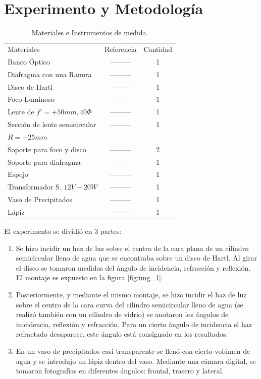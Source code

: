 \documentclass[
aps,
reprint,
amsmath, amssymb,
superscriptaddress,
]{revtex4-2}
\begin{document}
\section{\label{sec:expe}Experimento y Metodología}
\begin{table}[H]
	\caption{\label{tab:materiales}Materiales e Instrumentos de medida.}
	\begin{ruledtabular}
		\begin{tabular}{lcc}
            \textrm{Materiales} & \textrm{Referencia} & \textrm{Cantidad}\\
			\colrule
            Banco Óptico                & --------- & 1\\
			Diafragma con una Ranura    & --------- & 1\\
            Disco de Hartl              & --------- & 1\\
            Foco Luminoso               & --------- & 1\\
            Lente de $f'=+50mm, 40\Phi$ & --------- & 1\\
            Sección de lente semicircular & --------- & 1\\
            $R=+25mm$      & &\\
            Soporte para foco y disco   & --------- & 2\\
            Soporte para diafragma      & --------- & 1\\
            Espejo                      & --------- & 1\\
            Transformador S. $12V-20W$  & --------- & 1\\
            Vaso de Precipitados & --------- & 1\\
            Lápiz & --------- & 1\\
	\end{tabular}
	\end{ruledtabular}
\end{table}

El experimento se dividió en 3 partes:
\begin{enumerate}
    \item Se hizo incidir un haz de luz sobre el centro de la cara plana de un cilindro semicircular lleno de agua que se encontraba sobre un disco de Hartl. Al girar el disco se tomaron medidas del ángulo de incidencia, refracción y reflexión. El montaje es expuesto en la figura \ref{fig:img_1}.
    
    \item Posteriormente, y mediante el mismo montaje, se hizo incidir el haz de luz sobre el centro de la cara curva del cilindro semicircular lleno de agua (se realizó también con un cilindro de vidrio) se anotaron los ángulos de inicidencia, reflexión y refracción. Para un cierto ángulo de incidencia el haz refractado desaparece, este ángulo está consignado en los resultados.
    
    \item En un vaso de precipitados casi transparente se llenó con cierto volúmen de agua y se introdujo un lápiz dentro del vaso. Mediante una cámara digital, se tomaron fotografías en diferentes ángulos: frontal, trasero y lateral. 
    
    
\end{enumerate}
\end{document}
